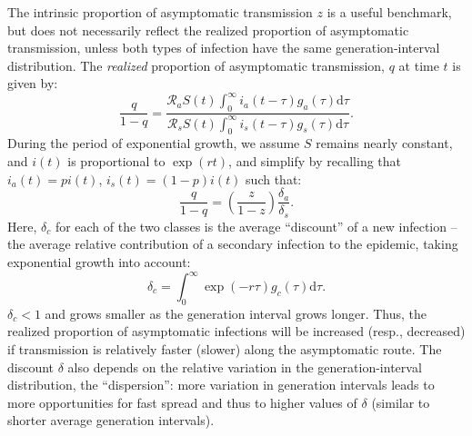 The intrinsic proportion of asymptomatic transmission $z$ is a useful benchmark, but does not necessarily reflect the realized proportion of asymptomatic transmission, unless both types of infection have the same generation-interval distribution.
The \emph{realized} proportion of asymptomatic transmission, $q$ at time $t$ is given by:
\begin{equation}
\frac{q}{1-q}=\frac{\mathcal R_a S(t) \int_0^\infty i_a(t-\tau) g_a(\tau) \mathrm{d}\tau}{\mathcal R_s S(t) \int_0^\infty i_s(t-\tau) g_s(\tau) \mathrm{d}\tau}.
\end{equation}
During the period of exponential growth, we assume $S$ remains nearly constant, and $i(t)$ is proportional to $\exp(r t)$, and simplify by recalling that $i_a(t)= p i(t)$, $i_s(t)=(1-p)i(t)$ such that: 
\begin{equation}
\frac{q}{1-q}=\left(\frac{z}{1-z}\right)\frac{\delta_a}{\delta_s}.
\label{eq.qratio}
\end{equation}
Here, $\delta_c$ for each of the two classes is the average ``discount'' of a new infection -- the average relative contribution of a secondary infection to the epidemic, taking exponential growth into account:
\begin{equation}
	\delta_c = \int_0^\infty \exp(-r\tau) g_c(\tau) \mathrm{d}\tau.
\end{equation}
$\delta_c<1$ and grows smaller as the generation interval grows longer.
Thus, the realized proportion of asymptomatic infections will be increased (resp., decreased) if transmission is relatively faster (slower) along the asymptomatic route.
The discount $\delta$ also depends on the relative variation in the generation-interval distribution, the ``dispersion'': more variation in generation intervals leads to more opportunities for fast spread and thus to higher values of $\delta$ (similar to shorter average generation intervals). 

